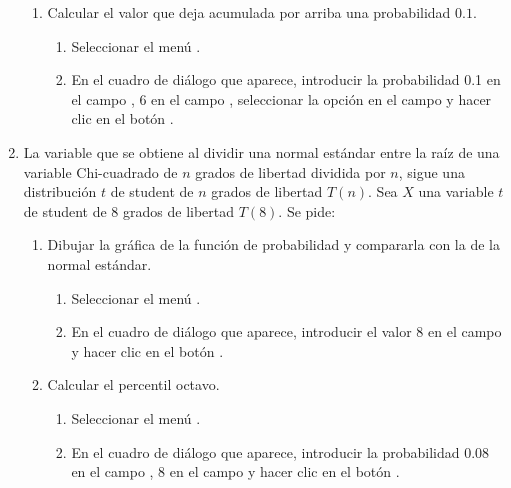 \begin{enumerate}[leftmargin=*]
\begin{enumerate}
\item Calcular el valor que deja acumulada por arriba una probabilidad $0.1$.
\begin{indicacion}{
\begin{enumerate}
\item Seleccionar el menú .
\item En el cuadro de diálogo que aparece, introducir la probabilidad 0.1 en el campo , 6 en el
campo , seleccionar la opción  en el campo  y hacer
clic en el botón .
\end{enumerate}}
\end{indicacion}
\end{enumerate}


\item La variable que se obtiene al dividir una normal estándar entre la raíz de una variable Chi-cuadrado de $n$ grados
de libertad dividida por $n$, sigue una distribución $t$ de student de $n$ grados de libertad $T(n)$. 
Sea $X$ una variable $t$ de student de 8 grados de libertad $T(8)$. Se pide:
\begin{enumerate}
\item Dibujar la gráfica de la función de probabilidad y compararla con la de la normal estándar.
\begin{indicacion}{
\begin{enumerate}
\item Seleccionar el menú .
\item En el cuadro de diálogo que aparece, introducir el valor 8 en el campo  y hacer clic en
el botón .
\end{enumerate}}
\end{indicacion}

\item Calcular el percentil octavo. 
\begin{indicacion}{
\begin{enumerate}
\item Seleccionar el menú .
\item En el cuadro de diálogo que aparece, introducir la probabilidad 0.08 en el campo , 8 en el campo  y hacer clic en el botón .
\end{enumerate}}
\end{indicacion}


\end{enumerate}
\end{enumerate}
